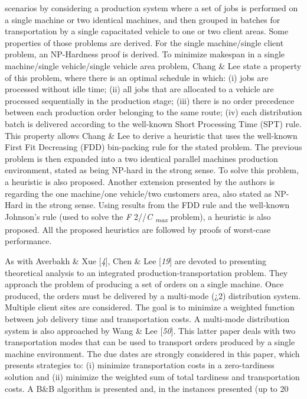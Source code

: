  scenarios by considering a production system where a set of jobs is performed on a
 single machine or two identical machines, and then grouped in batches for
 transportation by a single capacitated vehicle to one or two client areas. Some
 properties of those problems are derived. For the single machine/single client
 problem, an NP-Hardness proof is derived. To minimize makespan in a single
 machine/single vehicle/single vehicle area problem, Chang \& Lee state a property
 of this problem, where there is an optimal schedule in which: (i) jobs are processed
 without idle time; (ii) all jobs that are allocated to a vehicle are processed
 sequentially in the production stage; (iii) there is no order precedence between each
 production order belonging to the same route; (iv) each distribution batch is
 delivered according to the well-known Short Processing Time (SPT) rule. This property
 allows Chang \& Lee to derive a heuristic that uses the well-known First Fit
 Decreasing (FDD) bin-packing rule for the stated problem. The previous problem is
 then expanded into a two identical parallel machines production environment, stated
 as being NP-hard in the strong sense. To solve this problem, a heuristic is also
 proposed. Another extension presented by the authors is regarding the one machine/one
 vehicle/two customers area, also stated as NP-Hard in the strong sense. Using results
 from the FDD rule and the well-known Johnson's rule (used to solve the
 \textit{F} 2//\textit{C \textsubscript{max}} problem), a heuristic is
 also proposed. All the proposed heuristics are followed by proofs of worst-case
 performance.\par As with Averbakh \& Xue [\textit{4}], Chen \& Lee
 [\textit{19}] are devoted to presenting theoretical
 analysis to an integrated production-transportation problem. They approach the
 problem of producing a set of orders on a single machine. Once produced, the orders
 must be delivered by a multi-mode (¿2) distribution system. Multiple client sites are
 considered. The goal is to minimize a weighted function between job delivery time and
 transportation costs. A multi-mode distribution system is also approached by Wang
 \& Lee [\textit{50}]. This latter paper deals with
 two transportation modes that can be used to transport orders produced by a single
 machine environment. The due dates are strongly considered in this paper, which
 presents strategies to: (i) minimize transportation costs in a zero-tardiness
 solution and (ii) minimize the weighted sum of total tardiness and transportation
 costs. A B\&B algorithm is presented and, in the instances presented (up to 20
